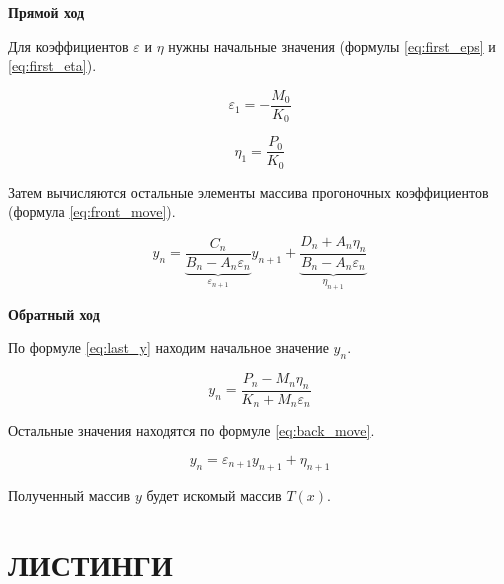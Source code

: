 \textbf{Прямой ход}

Для коэффициентов $\varepsilon$ и $\eta$ нужны начальные значения
(формулы \ref{eq:first_eps} и \ref{eq:first_eta}).

\begin{equation}\label{eq:first_eps}
    \varepsilon_1 = -\frac{M_0}{K_0}
\end{equation}

\begin{equation}\label{eq:first_eta}
    \eta_1 = \frac{P_0}{K_0}
\end{equation}

Затем вычисляются остальные элементы массива прогоночных коэффициентов
(формула \ref{eq:front_move}).

\begin{equation}\label{eq:front_move}
    y_n =
    \underbrace{\frac{C_n}{B_n - A_n \varepsilon_n}}_{\varepsilon_{n+1}} y_{n+1} +
    \underbrace{\frac{D_n + A_n \eta_n}{B_n - A_n \varepsilon_n}}_{\eta_{n+1}}
\end{equation}

\textbf{Обратный ход}

По формуле \ref{eq:last_y} находим начальное значение $y_n$.

\begin{equation}\label{eq:last_y}
    y_n = \frac{P_n - M_n \eta_n}{K_n + M_n \varepsilon_n}
\end{equation}

Остальные значения находятся по формуле \ref{eq:back_move}.

\begin{equation}\label{eq:back_move}
    y_n = \varepsilon_{n+1} y_{n+1} + \eta_{n+1}
\end{equation}

Полученный массив $y$ будет искомый массив $T(x)$.

\section{ЛИСТИНГИ}

